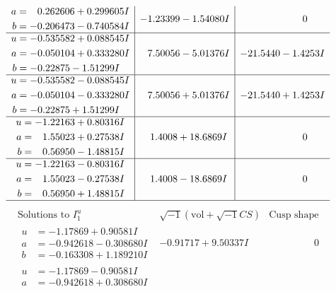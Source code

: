 \documentclass[1p]{elsarticle_modified}
\theoremstyle{definition}
\newcommand{\I}{\sqrt{-1}}
\begin{document}
$$\begin{array}{c|c|c}
\begin{aligned}
a &= \phantom{-}0.262606 + 0.299605 I \\
b &= -0.206473 - 0.740584 I\end{aligned}
 & -1.23399 - 1.54080 I & \phantom{-0.000000 } 0 \\ \hline\begin{aligned}
u &= -0.535582 + 0.088545 I \\
a &= -0.050104 + 0.333280 I \\
b &= -0.22875 - 1.51299 I\end{aligned}
 & \phantom{-}7.50056 - 5.01376 I & -21.5440 - 1.4253 I \\ \hline\begin{aligned}
u &= -0.535582 - 0.088545 I \\
a &= -0.050104 - 0.333280 I \\
b &= -0.22875 + 1.51299 I\end{aligned}
 & \phantom{-}7.50056 + 5.01376 I & -21.5440 + 1.4253 I \\ \hline\begin{aligned}
u &= -1.22163 + 0.80316 I \\
a &= \phantom{-}1.55023 + 0.27538 I \\
b &= \phantom{-}0.56950 - 1.48815 I\end{aligned}
 & \phantom{-}1.4008 + 18.6869 I & \phantom{-0.000000 } 0 \\ \hline\begin{aligned}
u &= -1.22163 - 0.80316 I \\
a &= \phantom{-}1.55023 - 0.27538 I \\
b &= \phantom{-}0.56950 + 1.48815 I\end{aligned}
 & \phantom{-}1.4008 - 18.6869 I & \phantom{-0.000000 } 0\\
 \hline 
 \end{array}$$\newpage$$\begin{array}{c|c|c}  
\text{Solutions to }I^u_{1}& \I (\text{vol} + \sqrt{-1}CS) & \text{Cusp shape}\\
 \hline 
\begin{aligned}
u &= -1.17869 + 0.90581 I \\
a &= -0.942618 - 0.308680 I \\
b &= -0.163308 + 1.189210 I\end{aligned}
 & -0.91717 + 9.50337 I & \phantom{-0.000000 } 0 \\ \hline\begin{aligned}
u &= -1.17869 - 0.90581 I \\
a &= -0.942618 + 0.308680 I \\

\end{aligned}
\end{array}$$
\end{document}
